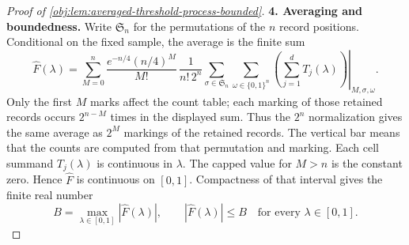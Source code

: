 \begin{proof}[Proof of \cref{obj:lem:averaged-threshold-process-bounded}]
\noindent\textbf{4. Averaging and boundedness.}
Write \(\mathfrak S_n\) for the permutations of the \(n\) record positions. Conditional on the fixed sample, the average is the finite sum
\[
\widehat F(\lambda)
=
\sum_{M=0}^{n}
\frac{e^{-n/4}(n/4)^M}{M!}\,
\frac{1}{n!\,2^n}
\sum_{\sigma\in\mathfrak S_n}
\sum_{\omega\in\{0,1\}^n}
\left.\left(\sum_{j=1}^{d}T_j(\lambda)\right)
\right|_{M,\sigma,\omega}.
\]
Only the first \(M\) marks affect the count table; each marking of those retained records occurs \(2^{n-M}\) times in the displayed sum. Thus the \(2^n\) normalization gives the same average as \(2^M\) markings of the retained records. The vertical bar means that the counts are computed from that permutation and marking. Each cell summand \(T_j(\lambda)\) is continuous in \(\lambda\). The capped value for \(M>n\) is the constant zero. Hence \(\widehat F\) is continuous on \([0,1]\). Compactness of that interval gives the finite real number
\[
B=\max_{\lambda\in[0,1]}|\widehat F(\lambda)|,
\qquad
|\widehat F(\lambda)|\leq B
\quad\text{for every }\lambda\in[0,1].
\]
\end{proof}
